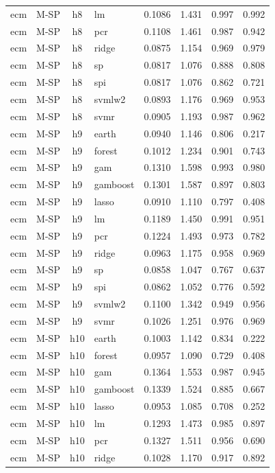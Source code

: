 \begin{ThreePartTable}
\begin{longtable}[t]{llclcccc}
ecm & M-SP & h8 & lm & 0.1086 & 1.431 & 0.997 & 0.992\\
ecm & M-SP & h8 & pcr & 0.1108 & 1.461 & 0.987 & 0.942\\
ecm & M-SP & h8 & ridge & 0.0875 & 1.154 & 0.969 & 0.979\\
ecm & M-SP & h8 & sp & 0.0817 & 1.076 & 0.888 & 0.808\\
ecm & M-SP & h8 & spi & 0.0817 & 1.076 & 0.862 & 0.721\\
ecm & M-SP & h8 & svmlw2 & 0.0893 & 1.176 & 0.969 & 0.953\\
ecm & M-SP & h8 & svmr & 0.0905 & 1.193 & 0.987 & 0.962\\
\addlinespace
ecm & M-SP & h9 & earth & 0.0940 & 1.146 & 0.806 & 0.217\\
ecm & M-SP & h9 & forest & 0.1012 & 1.234 & 0.901 & 0.743\\
ecm & M-SP & h9 & gam & 0.1310 & 1.598 & 0.993 & 0.980\\
ecm & M-SP & h9 & gamboost & 0.1301 & 1.587 & 0.897 & 0.803\\
ecm & M-SP & h9 & lasso & 0.0910 & 1.110 & 0.797 & 0.408\\
ecm & M-SP & h9 & lm & 0.1189 & 1.450 & 0.991 & 0.951\\
ecm & M-SP & h9 & pcr & 0.1224 & 1.493 & 0.973 & 0.782\\
ecm & M-SP & h9 & ridge & 0.0963 & 1.175 & 0.958 & 0.969\\
ecm & M-SP & h9 & sp & 0.0858 & 1.047 & 0.767 & 0.637\\
ecm & M-SP & h9 & spi & 0.0862 & 1.052 & 0.776 & 0.592\\
ecm & M-SP & h9 & svmlw2 & 0.1100 & 1.342 & 0.949 & 0.956\\
ecm & M-SP & h9 & svmr & 0.1026 & 1.251 & 0.976 & 0.969\\
\addlinespace
ecm & M-SP & h10 & earth & 0.1003 & 1.142 & 0.834 & 0.222\\
ecm & M-SP & h10 & forest & 0.0957 & 1.090 & 0.729 & 0.408\\
ecm & M-SP & h10 & gam & 0.1364 & 1.553 & 0.987 & 0.945\\
ecm & M-SP & h10 & gamboost & 0.1339 & 1.524 & 0.885 & 0.667\\
ecm & M-SP & h10 & lasso & 0.0953 & 1.085 & 0.708 & 0.252\\
ecm & M-SP & h10 & lm & 0.1293 & 1.473 & 0.985 & 0.897\\
ecm & M-SP & h10 & pcr & 0.1327 & 1.511 & 0.956 & 0.690\\
ecm & M-SP & h10 & ridge & 0.1028 & 1.170 & 0.917 & 0.892\\

\end{longtable}
\end{ThreePartTable}
